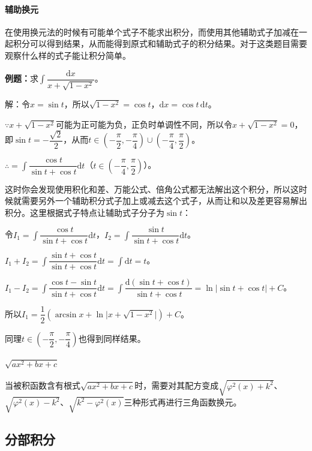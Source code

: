 \documentclass[UTF8, 12pt]{ctexart}
\begin{document}
\paragraph{辅助换元} \leavevmode \medskip

在使用换元法的时候有可能单个式子不能求出积分，而使用其他辅助式子加减在一起积分可以得到结果，从而能得到原式和辅助式子的积分结果。对于这类题目需要观察什么样的式子能让积分简单。

\textbf{例题：}求$\displaystyle{\int\dfrac{\textrm{d}x}{x+\sqrt{1-x^2}}}$。\medskip

解：令$x=\sin t$，所以$\sqrt{1-x^2}=\cos t$，$\textrm{d}x=\cos t\,\textrm{d}t$。

$\because x+\sqrt{1-x^2}$可能为正可能为负，正负时单调性不同，所以令$ x+\sqrt{1-x^2}=0$，即$\sin t=-\dfrac{\sqrt{2}}{2}$，从而$t\in(-\dfrac{\pi}{2},-\dfrac{\pi}{4})\cup(-\dfrac{\pi}{4},\dfrac{\pi}{2})$。

$\therefore=\displaystyle{\int\dfrac{\cos t}{\sin t+\cos t}\textrm{d}t}$（$t\in(-\dfrac{\pi}{4},\dfrac{\pi}{2})$）。 \medskip

这时你会发现使用积化和差、万能公式、倍角公式都无法解出这个积分，所以这时候就需要另外一个辅助积分式子加上或减去这个式子，从而让和以及差更容易解出积分。这里根据式子特点让辅助式子分子为$\sin t$：

令$I_1=\displaystyle{\int\dfrac{\cos t}{\sin t+\cos t}\textrm{d}t}$，$I_2=\displaystyle{\int\dfrac{\sin t}{\sin t+\cos t}\textrm{d}t}$。

$I_1+I_2=\displaystyle{\int\dfrac{\sin t+\cos t}{\sin t+\cos t}\textrm{d}t=\int\textrm{d}t=t}$。

$I_1-I_2=\displaystyle{\int\dfrac{\cos t-\sin t}{\sin t+\cos t}\textrm{d}t=\int\dfrac{\textrm{d}(\sin t+\cos t)}{\sin t+\cos t}}=\ln\vert\sin t+\cos t\vert +C$。

所以$I_1=\dfrac{1}{2}(\arcsin x+\ln\vert x+\sqrt{1-x^2}\vert)+C$。

同理$t\in(-\dfrac{\pi}{2},-\dfrac{\pi}{4})$也得到同样结果。

\paragraph{\texorpdfstring{$\sqrt{ax^2+bx+c}$}\ } \leavevmode \medskip

当被积函数含有根式$\sqrt{ax^2+bx+c}$时，需要对其配方变成$\sqrt{\varphi^2(x)+k^2}$、$\sqrt{\varphi^2(x)-k^2}$、$\sqrt{k^2-\varphi^2(x)}$三种形式再进行三角函数换元。

\subsection{分部积分}
\end{document}

